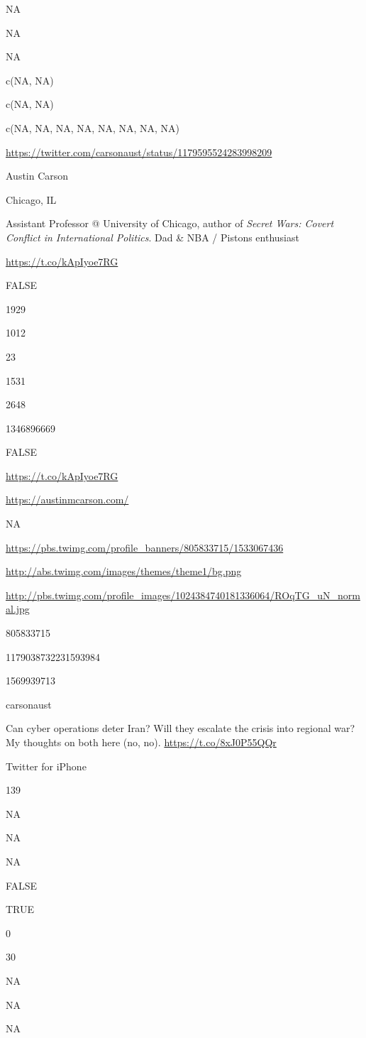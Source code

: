 \documentclass[]{book}
\begin{document}
NA

NA

NA

c(NA, NA)

c(NA, NA)

c(NA, NA, NA, NA, NA, NA, NA, NA)

\url{https://twitter.com/carsonaust/status/1179595524283998209}

Austin Carson

Chicago, IL

Assistant Professor @ University of Chicago, author of \emph{Secret
Wars: Covert Conflict in International Politics}. Dad \& NBA / Pistons
enthusiast

\url{https://t.co/kApIyoe7RG}

FALSE

1929

1012

23

1531

2648

1346896669

FALSE

\url{https://t.co/kApIyoe7RG}

\url{https://austinmcarson.com/}

NA

\url{https://pbs.twimg.com/profile_banners/805833715/1533067436}

\url{http://abs.twimg.com/images/themes/theme1/bg.png}

\url{http://pbs.twimg.com/profile_images/1024384740181336064/ROqTG_uN_normal.jpg}

805833715

1179038732231593984

1569939713

carsonaust

Can cyber operations deter Iran? Will they escalate the crisis into
regional war? My thoughts on both here (no, no).
\url{https://t.co/8xJ0P55QQr}

Twitter for iPhone

139

NA

NA

NA

FALSE

TRUE

0

30

NA

NA

NA
\end{document}
